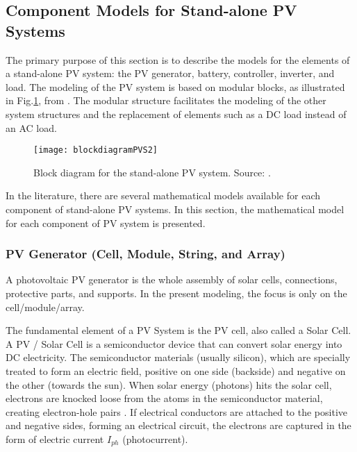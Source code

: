 \subsection{Component Models for Stand-alone PV Systems}
\label{sec:model}

The primary purpose of this section is to describe the models for the elements of a stand-alone PV system: the PV generator, battery, controller, inverter, and load. The modeling of the PV system is based on modular blocks, as illustrated in Fig.\ref{fig:blockdiagram}, from \cite{Hansen}. The modular structure facilitates the modeling of the other system structures and the replacement of elements such as a DC load instead of an AC load. 

\begin{figure}[h]
\texttt{[image: blockdiagramPVS2]}
\centering
\caption{Block diagram for the stand-alone PV system. Source: \cite{Hansen}.}
\label{fig:blockdiagram}
\end{figure}

In the literature, there are several mathematical models available for each component of stand-alone PV systems. In this section, the mathematical model for each component of PV system is presented. 

\subsubsection{PV Generator (Cell, Module, String, and Array) }

A photovoltaic PV generator is the whole assembly of solar cells, connections, protective parts, and supports. In the present modeling, the focus is only on the cell/module/array.
 
The fundamental element of a PV System is the PV cell, also called a Solar Cell. A PV / Solar Cell is a semiconductor device that can convert solar energy into DC electricity. The semiconductor materials (usually silicon), which are specially treated to form an electric field, positive on one side (backside) and negative on the other (towards the sun). When solar energy (photons) hits the solar cell, electrons are knocked loose from the atoms in the semiconductor material, creating electron-hole pairs \cite{Lorenzo}. If electrical conductors are attached to the positive and negative sides, forming an electrical circuit, the electrons are captured in the form of electric current $ I_{ph} $ (photocurrent).
 
